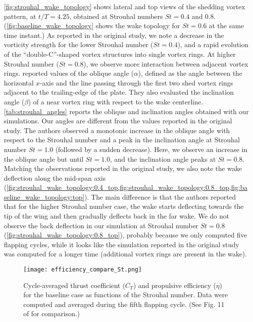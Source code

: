 \cref{fig:strouhal_wake_topology} shows lateral and top views of the shedding vortex pattern, at $t/T = 4.25$, obtained at Strouhal numbers $St = 0.4$ and $0.8$.
(\cref{fig:baseline_wake_topology} shows the wake topology for $St = 0.6$ at the same time instant.)
As reported in the original study, we note a decrease in the vorticity strength for the lower Strouhal number ($St = 0.4$), and a rapid evolution of the ``double-C''-shaped vortex structures into single vortex rings.
At higher Strouhal number ($St = 0.8$), we observe more interaction between adjacent vortex rings.
\citet{li_dong_2016} reported values of the oblique angle ($\alpha$), defined as the angle between the horizontal $x$-axis and the line passing through the first two shed vortex rings adjacent to the trailing-edge of the plate.
They also evaluated the inclination angle ($\beta$) of a near vortex ring with respect to the wake centerline.
\cref{tab:strouhal_angles} reports the oblique and inclination angles obtained with our simulations.
Our angles are different from the values reported in the original study.
The authors observed a monotonic increase in the oblique angle with respect to the Strouhal number and a peak in the inclination angle at Strouhal number $St = 1.0$ (followed by a sudden decrease).
Here, we observe an increase in the oblique angle but until $St = 1.0$, and the inclination angle peaks at $St = 0.8$.
Matching the observations reported in the original study, we also note the wake deflection along the mid-span axis (\cref{fig:strouhal_wake_topology:0.4_top,fig:strouhal_wake_topology:0.8_top,fig:baseline_wake_topology:top}).
The main difference is that the authors reported that for the higher Strouhal number case, the wake starts deflecting towards the tip of the wing and then gradually deflects back in the far wake.
We do not observe the back deflection in our simulation at Strouhal number $St = 0.8$ (\cref{fig:strouhal_wake_topology:0.8_top}), probably because we only computed five flapping cycles, while it looks like the simulation reported in the original study was computed for a longer time (additional vortex rings are present in the wake).

\begin{figure}[!h]
  \centering
  \texttt{[image: efficiency\_compare\_St.png]}
  \caption{Cycle-averaged thrust coefficient ($\overline{C_T}$) and propulsive efficiency ($\eta$) for the baseline case as functions of the Strouhal number. Data were computed and averaged during the fifth flapping cycle. (See Fig. 11 of \citet{li_dong_2016} for comparison.)}
  \label{fig:strouhal_propulsive_efficiency}
\end{figure}

